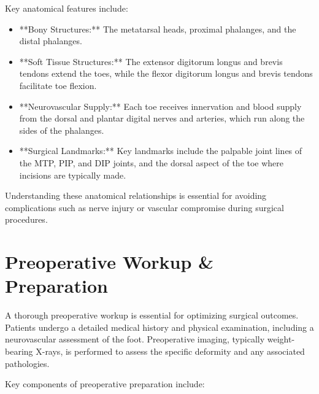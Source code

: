 Key anatomical features include:

\begin{itemize}
  \item **Bony Structures:** The metatarsal heads, proximal phalanges, and the distal phalanges.
  \item **Soft Tissue Structures:** The extensor digitorum longus and brevis tendons extend the toes, while the flexor digitorum longus and brevis tendons facilitate toe flexion. 
  \item **Neurovascular Supply:** Each toe receives innervation and blood supply from the dorsal and plantar digital nerves and arteries, which run along the sides of the phalanges.
  \item **Surgical Landmarks:** Key landmarks include the palpable joint lines of the MTP, PIP, and DIP joints, and the dorsal aspect of the toe where incisions are typically made.
\end{itemize}

Understanding these anatomical relationships is essential for avoiding complications such as nerve injury or vascular compromise during surgical procedures.

\section*{Preoperative Workup \& Preparation}
A thorough preoperative workup is essential for optimizing surgical outcomes. Patients undergo a detailed medical history and physical examination, including a neurovascular assessment of the foot. Preoperative imaging, typically weight-bearing X-rays, is performed to assess the specific deformity and any associated pathologies.

Key components of preoperative preparation include:

